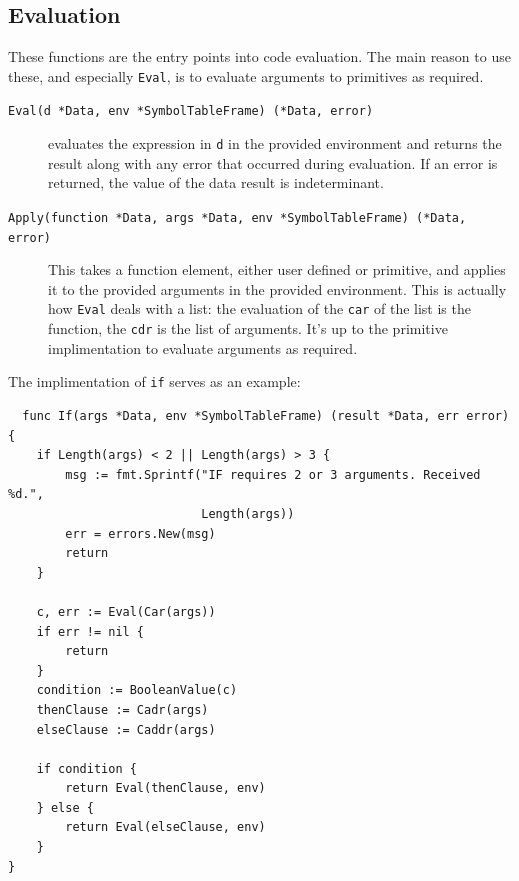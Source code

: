 \documentclass[12pt]{article}
\begin{document}
\subsection{Evaluation}

These functions are the entry points into code evaluation. The main
reason to use these, and especially \verb|Eval|, is to evaluate
arguments to primitives as required.

\begin{description}
\item [{\tt Eval(d *Data, env *SymbolTableFrame) (*Data, error)}] evaluates the expression in \verb|d| in the provided
  environment and returns the result along with any error that
  occurred during evaluation. If an error is returned, the value of
  the data result is indeterminant.
\item [{\tt Apply(function *Data, args *Data, env *SymbolTableFrame)
    (*Data, error)}] This takes a function element, either
  user defined or primitive, and applies it to the provided arguments
  in the provided environment. This is actually how \verb|Eval| deals
  with a list: the evaluation of the \verb|car| of the list is the
  function, the \verb|cdr| is the list of arguments. It's up to the
  primitive implimentation to evaluate arguments as required.
\end{description}

The implimentation of \verb|if| serves as an example:

\begin{verbatim}
  func If(args *Data, env *SymbolTableFrame) (result *Data, err error) {
    if Length(args) < 2 || Length(args) > 3 {
        msg := fmt.Sprintf("IF requires 2 or 3 arguments. Received %d.", 
                           Length(args))
        err = errors.New(msg)
        return
    }

    c, err := Eval(Car(args))
    if err != nil {
        return
    }
    condition := BooleanValue(c)
    thenClause := Cadr(args)
    elseClause := Caddr(args)

    if condition {
        return Eval(thenClause, env)
    } else {
        return Eval(elseClause, env)
    }
}

\end{verbatim}



\end{document}
